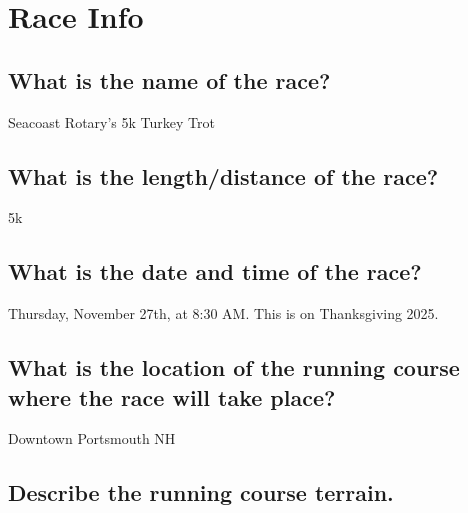 \documentclass[letterpaper]{article}
\newcommand{\titleDOC}{}
\newcommand{\authorDOC}{Daniel Sabalakov}
\newcommand{\classDOC}{}
\newcommand{\quoteDOC}{``\textit{Truth is ever to be found in the simplicity, and not in the multiplicity and confusion of things}'' - Issac Newton}
\begin{document}








\renewcommand{\authorDOC}{Daniel Sabalakov}

\renewcommand{\titleDOC}{4.3 Race Research}

\renewcommand{\quoteDOC}{``\textit{May the Force Be With You}'' \\ \textemdash{} General Jan Dodonna}

\renewcommand{\classDOC}{PE Running}



\section{Race Info}\label{race-info}

\subsection{What is the name of the race?}\label{what-is-the-name-of-the-race}

Seacoast Rotary's 5k Turkey Trot

\subsection{What is the length/distance of the race?}\label{what-is-the-lengthdistance-of-the-race}

5k

\subsection{What is the date and time of the race?}\label{what-is-the-date-and-time-of-the-race}

Thursday, November 27th, at 8:30 AM. This is on Thanksgiving 2025.

\subsection{What is the location of the running course where the race will take place?}\label{what-is-the-location-of-the-running-course-where-the-race-will-take-place}

Downtown Portsmouth NH

\subsection{Describe the running course terrain.}\label{describe-the-running-course-terrain.}
\end{document}
